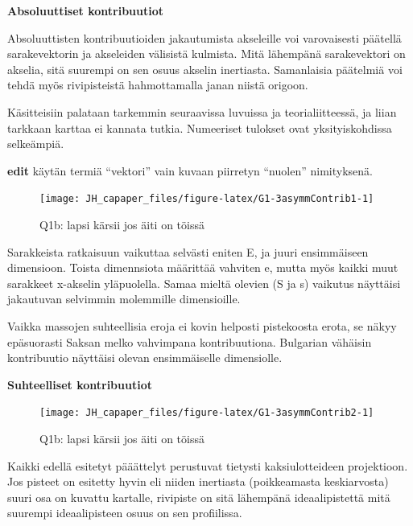 \documentclass[
  finnish,
]{book}
\begin{document}
\textbf{Absoluuttiset kontribuutiot}

Absoluuttisten kontribuutioiden jakautumista akseleille voi varovaisesti päätellä
sarakevektorin ja akseleiden välisistä kulmista. Mitä lähempänä sarakevektori on akselia,
sitä suurempi on sen osuus akselin inertiasta. Samanlaisia päätelmiä voi tehdä myös
rivipisteistä hahmottamalla janan niistä origoon.

Käsitteisiin palataan tarkemmin seuraavissa luvuissa ja teorialiitteessä, ja liian
tarkkaan karttaa ei kannata tutkia. Numeeriset tulokset ovat yksityiskohdissa selkeämpiä.

\textbf{edit} käytän termiä ``vektori'' vain kuvaan piirretyn ``nuolen'' nimityksenä.

\begin{figure}

{\centering \texttt{[image: JH\_capaper\_files/figure-latex/G1-3asymmContrib1-1]} 

}

\caption{Q1b: lapsi kärsii jos äiti on töissä}\label{fig:G1-3asymmContrib1}
\end{figure}

Sarakkeista ratkaisuun vaikuttaa selvästi eniten E, ja juuri ensimmäiseen
dimensioon. Toista dimennsiota määrittää vahviten e, mutta myös kaikki muut
sarakkeet x-akselin yläpuolella. Samaa mieltä olevien (S ja s) vaikutus näyttäisi
jakautuvan selvimmin molemmille dimensioille.

Vaikka massojen suhteellisia eroja ei kovin helposti pistekoosta erota, se näkyy
epäsuorasti Saksan melko vahvimpana kontribuutiona. Bulgarian vähäisin kontribuutio
näyttäisi olevan ensimmäiselle dimensiolle.

\textbf{Suhteelliset kontribuutiot}

\begin{figure}

{\centering \texttt{[image: JH\_capaper\_files/figure-latex/G1-3asymmContrib2-1]} 

}

\caption{Q1b: lapsi kärsii jos äiti on töissä}\label{fig:G1-3asymmContrib2}
\end{figure}

Kaikki edellä esitetyt pääättelyt perustuvat tietysti kaksiulotteideen projektioon.
Jos pisteet on esitetty hyvin eli niiden inertiasta (poikkeamasta keskiarvosta)
suuri osa on kuvattu kartalle, rivipiste on sitä lähempänä ideaalipistettä mitä
suurempi ideaalipisteen osuus on sen profiilissa.
\end{document}
